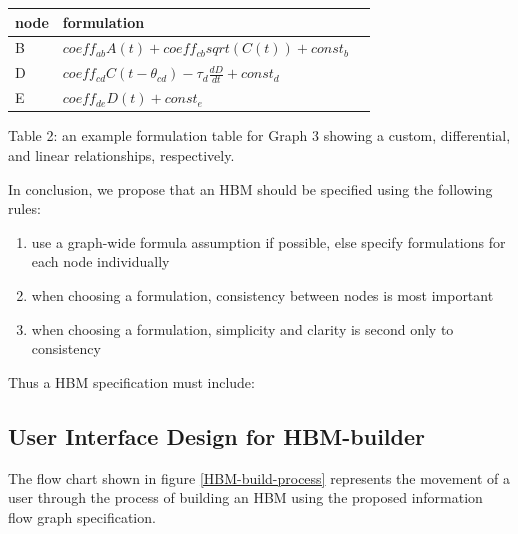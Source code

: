 \documentclass[conference]{IEEEtran}
\begin{document}
\begin{centering}
  \begin{tabular}{ | l | l | l |}
      \hline
      node & formulation \\ \hline
      B & $coeff_{ab}A(t) + coeff_{cb}sqrt(C(t)) + const_b$ \\ \hline
      D & $coeff_{cd}C(t-\theta_{cd}) - \tau_{d}\frac{dD}{dt} + const_{d}$ \\ \hline
      E & $coeff_{de}D(t) + const_{e}$ \\ \hline
  \end{tabular}

  Table 2: an example formulation table for Graph 3 showing a custom, differential, and linear relationships, respectively.
\end{centering}

In conclusion, we propose that an HBM should be specified using the following rules:

\begin{enumerate}
  \item use a graph-wide formula assumption if possible, else specify formulations for each node individually
  \item when choosing a formulation, consistency between nodes is most important
  \item when choosing a formulation, simplicity and clarity is second only to consistency
\end{enumerate}
  
Thus a HBM specification must include:

\subsection{User Interface Design for HBM-builder }
The flow chart shown in figure \ref{HBM-build-process} represents the movement of a user through the process of building an HBM using the proposed information flow graph specification.
\end{document}
